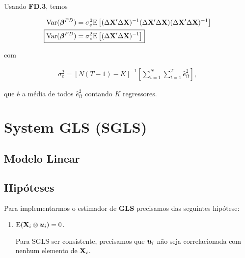 \documentclass[11pt, oneside, a4paper, article]{article}
\numberwithin{equation}{section}
\begin{document}
\begin{description}
Usando \textbf{FD.3}, temos

\vspace{-1 em}
\begin{align*} 
\Var( \betavec^{FD} ) &= 
\sigma_{e}^{2}
\E \left[
( \Delta \Xmat' \Delta \Xmat )^{-1}
( \Delta \Xmat' \Delta \Xmat )
( \Delta \Xmat' \Delta \Xmat )^{-1} 
\right]
\\
\Aboxed{
\Var( \betavec^{FD} ) &= 
\sigma^2_{e}
\E \left[
( \Delta \Xmat' \Delta \Xmat )^{-1} 
\right]}
\end{align*}

\noindent 
com

\vspace{-1 em}
\begin{align*} 
\sigma^2_{e} = 
\left[ N ( T - 1 ) - K \right]^{-1}
\left[  
\sum_{i=1}^{N} 
\sum_{t=1}^{T}
\hat{e}_{it}^{2}
\right],
\end{align*}

\noindent
que é a média de todos $\hat{e}^{2}_{it}$ contando $K$ regressores.

\clearpage
\section{System GLS (SGLS)}

\noindent
\citet[Sec.7.4 -- Consistency and Asymptotic Normality of Generalized Least Squares, p.153]{wool-2010} 

\subsection{Modelo Linear}

\subsection{Hipóteses}

Para implementarmos o estimador de \textbf{GLS} precisamos das seguintes hipótese:

\begin{enumerate}
\item %

$\text{E}(\mathbf{X}_{i} \otimes \boldsymbol{u}_{i}) = 0$.

Para SGLS ser consistente, precisamos que $\boldsymbol{u}_{i}$ não seja correlacionada com nenhum elemento de $\mathbf{X}_{i}$.


\end{enumerate}
\end{description}
\end{document}
